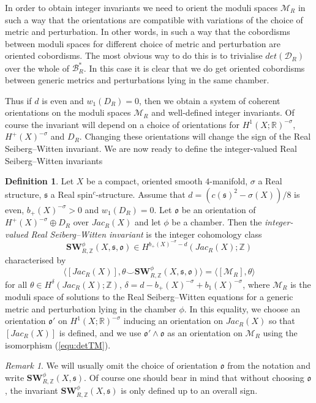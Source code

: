 \documentclass{amsart}
\theoremstyle{definition}
\newtheorem{definition}[theorem]{Definition}
\theoremstyle{remark}
\newtheorem{remark}[theorem]{Remark}
\numberwithin{equation}{section}
\begin{document}
In order to obtain integer invariants we need to orient the moduli spaces $\mathcal{M}_R$ in such a way that the orientations are compatible with variations of the choice of metric and perturbation. In other words, in such a way that the cobordisms between moduli spaces for different choice of metric and perturbation are oriented cobordisms. The most obvious way to do this is to trivialise $det(\mathcal{D}_R)$ over the whole of $\mathcal{B}^*_R$. In this case it is clear that we do get oriented cobordisms between generic metrics and perturbations lying in the same chamber.

Thus if $d$ is even and $w_1(D_R) = 0$, then we obtain a system of coherent orientations on the moduli spaces $\mathcal{M}_R$ and well-defined integer invariants. Of course the invariant will depend on a choice of orientations for $H^1(X ; \mathbb{R})^{-\sigma}$, $H^+(X)^{-\sigma}$ and $D_R$. Changing these orientations will change the sign of the Real Seiberg--Witten invariant. We are now ready to define the integer-valued Real Seiberg--Witten invariants

\begin{definition}\label{def:zsw}
Let $X$ be a compact, oriented smooth $4$-manifold, $\sigma$ a Real structure, $\mathfrak{s}$ a Real spin$^c$-structure. Assume that $d = (c(\mathfrak{s})^2 - \sigma(X))/8$ is even, $b_+(X)^{-\sigma} > 0$ and $w_1(D_R) = 0$. Let $\mathfrak{o}$ be an orientation of $H^+(X)^{-\sigma} \oplus D_R$ over $Jac_R(X)$ and let $\phi$ be a chamber. Then the {\em integer-valued Real Seiberg--Witten invariant} is the integer cohomology class
\[
\mathbf{SW}^\phi_{R,\mathbb{Z}}(X , \mathfrak{s} , \mathfrak{o}) \in H^{b_+(X)^{-\sigma} - d}(Jac_R(X) ; \mathbb{Z})
\]
characterised by
\[
\langle [Jac_R(X)] , \theta \smallsmile \mathbf{SW}^\phi_{R,\mathbb{Z}}(X,\mathfrak{s},\mathfrak{o}) \rangle = \langle [\mathcal{M}_R] , \theta \rangle
\]
for all $\theta \in H^\delta( Jac_R(X) ; \mathbb{Z})$, $\delta = d - b_+(X)^{-\sigma} + b_1(X)^{-\sigma}$, where $\mathcal{M}_R$ is the moduli space of solutions to the Real Seiberg--Witten equations for a generic metric and perturbation lying in the chamber $\phi$. In this equality, we choose an orientation $\mathfrak{o}'$ on $H^1(X ; \mathbb{R})^{-\sigma}$ inducing an orientation on $Jac_R(X)$ so that $[Jac_R(X)]$ is defined, and we use $\mathfrak{o}' \wedge \mathfrak{o}$ as an orientation on $\mathcal{M}_R$ using the isomorphism (\ref{equ:detTM}).
\end{definition}

\begin{remark}\label{rem:noorn}
We will usually omit the choice of orientation $\mathfrak{o}$ from the notation and write $\mathbf{SW}^\phi_{R,\mathbb{Z}}(X,\mathfrak{s})$. Of course one should bear in mind that without choosing $\mathfrak{o}$, the invariant $\mathbf{SW}^\phi_{R,\mathbb{Z}}(X,\mathfrak{s})$ is only defined up to an overall sign.
\end{remark}
\end{document}
